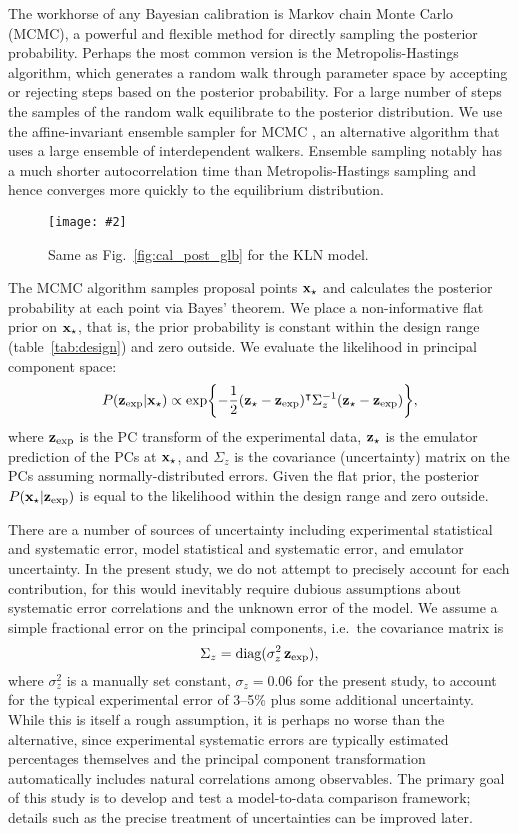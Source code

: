 \documentclass[aps,prc,reprint,superscriptaddress,amsmath]{revtex4-1}
\newcommand{\widefig}[3][t]{
  \begin{figure*}[#1]
    \texttt{[image: \#2]}
    \caption{\label{fig:#2}#3}
  \end{figure*}
}
\newcommand{\tran}{^\intercal}
\begin{document}
The workhorse of any Bayesian calibration is Markov chain Monte Carlo (MCMC), a powerful and flexible method for directly sampling the posterior probability.
Perhaps the most common version is the Metropolis-Hastings algorithm, which generates a random walk through parameter space by accepting or rejecting steps based on the posterior probability.
For a large number of steps the samples of the random walk equilibrate to the posterior distribution.
We use the affine-invariant ensemble sampler for MCMC \cite{Goodman:2010en,FM:2013mc}, an alternative algorithm that uses a large ensemble of interdependent walkers.
Ensemble sampling notably has a much shorter autocorrelation time than Metropolis-Hastings sampling and hence converges more quickly to the equilibrium distribution.

\widefig{cal_post_kln}{
  Same as Fig.~\ref{fig:cal_post_glb} for the KLN model.
}

The MCMC algorithm samples proposal points $\mathbf x_\star$ and calculates the posterior probability at each point via Bayes' theorem.
We place a non-informative flat prior on $\mathbf x_\star$, that is, the prior probability is constant within the design range (table~\ref{tab:design}) and zero outside.
We evaluate the likelihood in principal component space:
\begin{equation}
  P(\zexp|\xs) \propto \exp\biggl\{ -\frac{1}{2} (\zs - \zexp)\tran \Sigma_z^{-1} (\zs - \zexp) \biggr\},
  \label{eq:likelihood}
\end{equation}
where $\mathbf z_\text{exp}$ is the PC transform of the experimental data, $\mathbf z_\star$ is the emulator prediction of the PCs at $\mathbf x_\star$, and $\Sigma_z$ is the covariance (uncertainty) matrix on the PCs assuming normally-distributed errors.
Given the flat prior, the posterior $P(\mathbf x_\star|\mathbf z_\text{exp})$ is equal to the likelihood within the design range and zero outside.

There are a number of sources of uncertainty including experimental statistical and systematic error, model statistical and systematic error, and emulator uncertainty.
In the present study, we do not attempt to precisely account for each contribution, for this would inevitably require dubious assumptions about systematic error correlations and the unknown error of the model.
We assume a simple fractional error on the principal components, i.e.\ the covariance matrix is
\begin{equation}
  \Sigma_z = \text{diag}(\sigma^2_z\,\mathbf z_\text{exp}),
\end{equation}
where $\sigma^2_z$ is a manually set constant, $\sigma_z = 0.06$ for the present study, to account for the typical experimental error of 3--5\% \cite{Abelev:2014mda} plus some additional uncertainty.
While this is itself a rough assumption, it is perhaps no worse than the alternative, since experimental systematic errors are typically estimated percentages themselves and the principal component transformation automatically includes natural correlations among observables.
The primary goal of this study is to develop and test a model-to-data comparison framework; details such as the precise treatment of uncertainties can be improved later.
\end{document}
